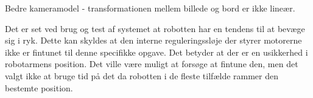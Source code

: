 Bedre kameramodel - transformationen mellem billede og bord er ikke lineær.\\ 

Det er set ved brug og test af systemet at robotten har en tendens til at bevæge sig i ryk. Dette kan skyldes at den interne reguleringssløje der styrer motorerne ikke er fintunet til denne specifikke opgave. Det betyder at der er en usikkerhed i robotarmens position. Det ville være muligt at forsøge at fintune den, men det valgt ikke at bruge tid på det da robotten i de fleste tilfælde rammer den bestemte position.\\